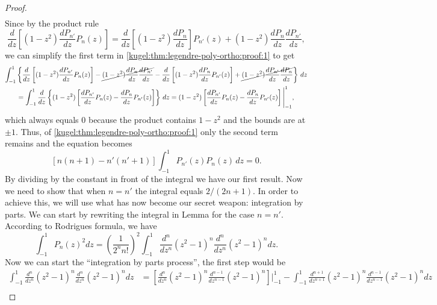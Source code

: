 \begin{proof}
\begin{gather}
  \end{gather}
  Since by the product rule
  \begin{equation*}
    \frac{d}{dz} \left[ (1 - z^2) \frac{dP_{n'}}{dz} P_n(z) \right]
    =
    \frac{d}{dz} \left[ (1 - z^2) \frac{dP_n}{dz} \right] P_{n'}(z)
      + (1 - z^2) \frac{dP_n}{dz} \frac{dP_{n'}}{dz},
  \end{equation*}
  we can simplify the first term in
  \eqref{kugel:thm:legendre-poly-ortho:proof:1} to get
  \begin{gather*}
    \int_{-1}^1 \left\{
      \frac{d}{dz} \left[ (1 - z^2) \frac{dP_{n'}}{dz} P_n(z) \right]
        - \cancel{(1 - z^2) \frac{dP_n}{dz} \frac{dP_{n'}}{dz}}
        - \frac{d}{dz} \left[ (1 - z^2) \frac{dP_n}{dz} P_{n'}(z) \right]
        + \cancel{(1 - z^2) \frac{dP_{n'}}{dz} \frac{dP_n}{dz}}
    \right\} \, dz \\
    = \int_{-1}^1 \frac{d}{dz} \left\{ (1 - z^2) \left[
      \frac{dP_{n'}}{dz} P_n(z) - \frac{dP_n}{dz} P_{n'}(z)
    \right] \right\} \, dz
    = (1 - z^2) \left[
      \frac{dP_{n'}}{dz} P_n(z) - \frac{dP_n}{dz} P_{n'}(z)
    \right] \Bigg|_{-1}^1,
  \end{gather*}
  which always equals 0 because the product contains $1 - z^2$ and the bounds
  are at $\pm 1$. Thus, of \eqref{kugel:thm:legendre-poly-ortho:proof:1} only
  the second term remains and the equation becomes
  \begin{equation*}
    \left[ n(n+1) - {n'}({n'}+1) \right] \int_{-1}^1 P_{n'}(z) P_n(z) \, dz = 0.
  \end{equation*}
  By dividing by the constant in front of the integral we have our first result.
  Now we need to show that when $n = {n'}$ the integral equals $2 / (2n + 1)$.
  In order to achieve this, we will use what has now become our secret weapon: 
  integration by parts. We can start by rewriting the integral in Lemma \label{kugel:thm:legendre-poly-ortho} for the case $n=n'$.
  According to Rodrigues formula, we have
  \begin{equation*}
    \int_{-1}^1 P_n(z)^2 dz = \left( \frac{1}{2^n n!} \right)^2 \int_{-1}^1 \frac{d^n}{dz^n} (z^2-1)^n \frac{d^n}{dz^n} (z^2-1)^n dz.
  \end{equation*}
  Now we can start the ``integration by parts process'', the first step would be
  \begin{align*}
    \int_{-1}^1 \frac{d^n}{dz^n} (z^2-1)^n \frac{d^n}{dz^n} (z^2-1)^n dz &= 
    \left[
      \frac{d^n}{dz^n} (z^2-1)^n \frac{d^{n-1}}{dz^{n-1}} (z^2-1)^n
    \right] \Bigg|_{-1}^1 - \int_{-1}^1 \frac{d^{n+1}}{dz^{n+1}} (z^2-1)^n \frac{d^{n-1}}{dz^{n-1}} (z^2-1)^n dz \\

\end{align*}
\end{proof}

